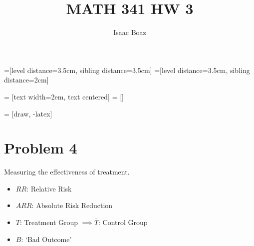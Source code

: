 \documentclass{article}
\title{\vspace{-5ex}MATH 341 HW 3}
\author{Isaac Boaz}
\begin{document}
=[level distance=3.5cm, sibling distance=3.5cm]
=[level distance=3.5cm, sibling distance=2cm]

 = [text width=2em, text centered]
 = []

 = [draw, -latex]

\maketitle

\section*{Problem 4}
Measuring the effectiveness of treatment.
\begin{itemize}[noitemsep]
    \item \(RR\): Relative Risk
    \item \(ARR\): Absolute Risk Reduction
    \item \(T\): Treatment Group \(\implies \overline{T}\): Control Group
    \item \(B\): `Bad Outcome'
\end{itemize}
\end{document}
